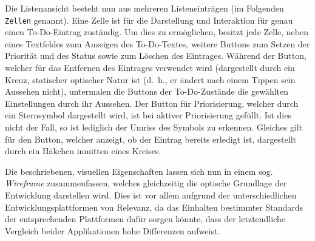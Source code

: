 Die Listenansicht besteht nun aus mehreren Listeneinträgen (im Folgenden \texttt{Zellen} genannt). Eine Zelle ist für die Darstellung und Interaktion für genau einen To-Do-Eintrag zuständig. Um dies zu ermöglichen, besitzt jede Zelle, neben eines Textfeldes zum Anzeigen des To-Do-Textes, weitere Buttons zum Setzen der Priorität und des Status sowie zum Löschen des Eintrages. Während der Button, welcher für das Entfernen des Eintrages verwendet wird (dargestellt durch ein Kreuz, statischer optischer Natur ist (d.\ h., er ändert nach einem Tippen sein Aussehen nicht), untermalen die Buttons der To-Do-Zustände die gewählten Einstellungen durch ihr Aussehen. Der Button für Priorisierung, welcher durch ein Sternsymbol dargestellt wird, ist bei aktiver Priorisierung gefüllt. Ist dies nicht der Fall, so ist lediglich der Umriss des Symbols zu erkennen. Gleiches gilt für den Button, welcher anzeigt, ob der Eintrag bereits erledigt ist, dargestellt durch ein Häkchen inmitten eines Kreises.

Die beschriebenen, visuellen Eigenschaften lassen sich nun in einem sog. \textit{Wireframe} zusammenfassen, welches gleichzeitig die optische Grundlage der Entwicklung darstellen wird. Dies ist vor allem aufgrund der unterschiedlichen Entwicklungsplattformen von Relevanz, da das Einhalten bestimmter Standards der entsprechenden Plattformen dafür sorgen könnte, dass der letztendliche Vergleich beider Applikationen hohe Differenzen aufweist.


